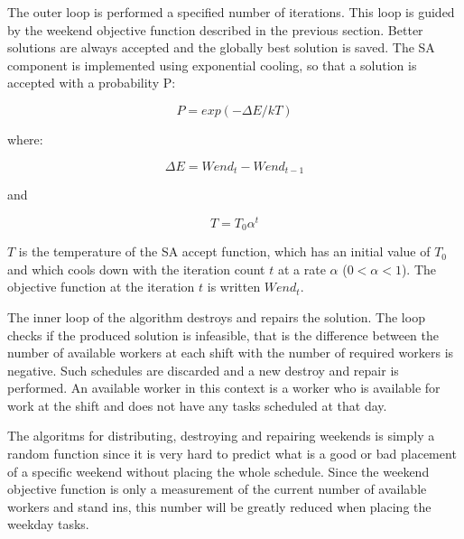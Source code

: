 The outer loop is performed a specified number of iterations. This loop is guided by the weekend objective function described in the previous section. Better solutions are always accepted and the globally best solution is saved. The SA component is implemented using exponential cooling, so that a solution is accepted with a probability P:

\begin{equation}
P = exp(-\Delta E /kT)
\label{eq0}
\end{equation}

where:

\begin{equation}
\Delta E = Wend_t - Wend_{t-1}
\label{eq1}
\end{equation}

and

\begin{equation}
T = T_0 \alpha^t
\label{eq2}
\end{equation}

$T$ is the temperature of the SA accept function, which has an initial value of $T_0$ and which cools down with the iteration count  $t$ at a rate $\alpha$ ($0 < \alpha < 1$). The objective function at the iteration $t$ is written $Wend_t$.


The inner loop of the algorithm destroys and repairs the solution. The loop checks if the produced solution is infeasible, that is the difference between the number of available workers at each shift with the number of required workers is negative. Such schedules are discarded and a new destroy and repair is performed. An available worker in this context is a worker who is available for work at the shift and does not have any tasks scheduled at that day.


The algoritms for distributing, destroying and repairing weekends is simply a random function since it is very hard to predict what is a good or bad placement of a specific weekend without placing the whole schedule. Since the weekend objective function is only a measurement of the current number of available workers and stand ins, this number will be greatly reduced when placing the weekday tasks. 


